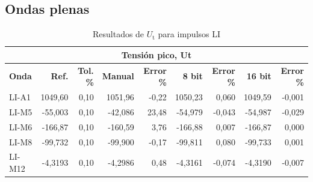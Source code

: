 \subsection*{Ondas plenas}
\label{subsec:precision_onda_plena}

\vspace{3\baselineskip}
\begin{table}[H]
    \centering
    \begin{tabular}{@{}lrrrrrrrr@{}}
        \toprule
        \multicolumn{9}{c}{\textbf{Tensión pico, Ut}}                                                                                                                     \\ \midrule
        \textbf{Onda} & \textbf{Ref.} & \textbf{Tol. \%} & \textbf{Manual} & \textbf{Error \%} & \textbf{8 bit} & \textbf{Error \%} & \textbf{16 bit} & \textbf{Error \%} \\ \midrule
        LI-A1         & 1049,60       & 0,10             & 1051,96         & -0,22             & 1050,23        & 0,060             & 1049,59         & -0,001            \\ \midrule
        LI-M5         & -55,003       & 0,10             & -42,086         & 23,48             & -54,979        & -0,043            & -54,987         & -0,029            \\ \midrule
        LI-M6         & -166,87       & 0,10             & -160,59         & 3,76              & -166,88        & 0,007             & -166,87         & 0,000             \\ \midrule
        LI-M8         & -99,732       & 0,10             & -99,900         & -0,17             & -99,811        & 0,080             & -99,733         & 0,001             \\ \midrule
        LI-M12        & -4,3193       & 0,10             & -4,2986         & 0,48              & -4,3161        & -0,074            & -4,3190         & -0,007            \\ \bottomrule
    \end{tabular}
    \caption{Resultados de $U_\text{t}$ para impulsos LI}
    \label{tab:resultados_ut_li}
\end{table}
\vspace{3\baselineskip}

